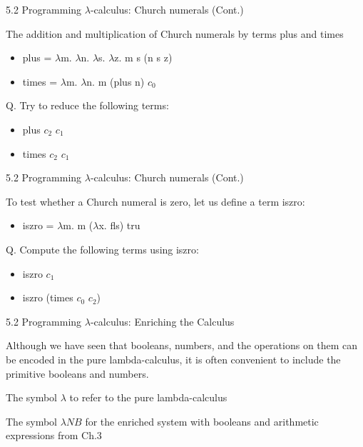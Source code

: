 \documentclass[table]{beamer}
\begin{document}
\begin{frame}[t]{5.2 Programming $\lambda$-calculus: Church numerals (Cont.)} 

The addition and multiplication of Church numerals by terms plus and times
\begin{itemize}
\item plus = $\lambda$m. $\lambda$n. $\lambda$s. $\lambda$z. m s (n s z)
\item times = $\lambda$m. $\lambda$n. m (plus n) $c_0$
\end{itemize}

\vspace{10pt}

Q. Try to reduce the following terms:
\begin{itemize}
\item plus $c_2$ $c_1$
\item times $c_2$ $c_1$
\end{itemize}

\end{frame}

\begin{frame}[t]{5.2 Programming $\lambda$-calculus: Church numerals (Cont.)} 

To test whether a Church numeral is zero, let us define a term iszro:
\begin{itemize}
\item iszro = $\lambda$m. m ($\lambda$x. fls) tru
\end{itemize}

\vspace{10pt}

Q. Compute the following terms using iszro:
\begin{itemize}
\item iszro $c_1$
\item iszro (times $c_0$ $c_2$)
\end{itemize}

\end{frame}

\begin{frame}[t]{5.2 Programming $\lambda$-calculus: Enriching the Calculus} \vspace{10pt}

Although we have seen that booleans, numbers, and the operations on them can be encoded in the pure lambda-calculus, it is often convenient to include the primitive booleans and numbers. 

\vspace{10pt}

The symbol $\lambda$ to refer to the pure lambda-calculus

\vspace{10pt}

The symbol $\lambda NB$ for the enriched system with booleans and arithmetic expressions from Ch.3

\end{frame}
\end{document}
